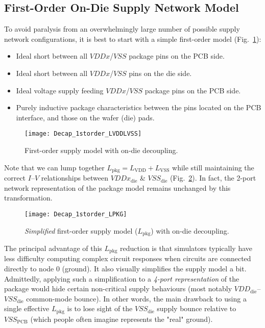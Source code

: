 \subsection{First-Order On-Die Supply Network Model}
\par To avoid paralysis from an overwhelmingly large number of possible supply
network configurations, it is best to start with a simple first-order model
(Fig.~\ref{fig:Decap_1storder_LVDDLVSS}):
%
\begin{itemize}[noitemsep]
\item Ideal short between all $VDDx$/$VSS$ package pins on the PCB side.
\item Ideal short between all $VDDx$/$VSS$ pins on the die side.
\item Ideal voltage supply feeding $VDDx$/$VSS$ package pins on the PCB side.
\item Purely inductive package characteristics between the pins located on the PCB interface, and those on the wafer (die) pads.
\end{itemize}
%
\begin{figure}[!ht]
	\centering
	\texttt{[image: Decap\_1storder\_LVDDLVSS]}
	\caption{First-order supply model with on-die decoupling.}
\label{fig:Decap_1storder_LVDDLVSS}%
\end{figure}
%
\par Note that we can lump together $L_\mathrm{pkg}=L_\mathrm{VDD}+L_\mathrm{VSS}$
while still maintaining the correct $I$--$V$ relationships between
$VDDx_\mathrm{die}$ \& $VSS_\mathrm{die}$ (Fig.~\ref{fig:Decap_1storder}).
In fact, the 2-port network representation of the package model remains
unchanged by this transformation.
%
\begin{figure}[!ht]
	\centering
	\texttt{[image: Decap\_1storder\_LPKG]}
	\caption{\emph{Simplified} first-order supply model ($L_\mathrm{pkg}$) with on-die decoupling.}
\label{fig:Decap_1storder}%
\end{figure}
%
\par The principal advantage of this $L_\mathrm{pkg}$ reduction is that
simulators typically have less difficulty computing complex circuit responses
when circuits are connected directly to node 0 (ground). It also visually
simplifies the supply model a bit. Admittedly, applying such a simplification to
a \emph{4-port representation} of the package would hide certain non-critical
supply behaviours (most notably $VDD_\mathrm{die}$--$VSS_\mathrm{die}$
common-mode bounce).  In other words, the main drawback to using a single
effective $L_\mathrm{pkg}$ is to lose sight of the $VSS_\mathrm{die}$ supply
bounce relative to $VSS_\mathrm{PCB}$ (which people often imagine represents
the "real" ground).
%
